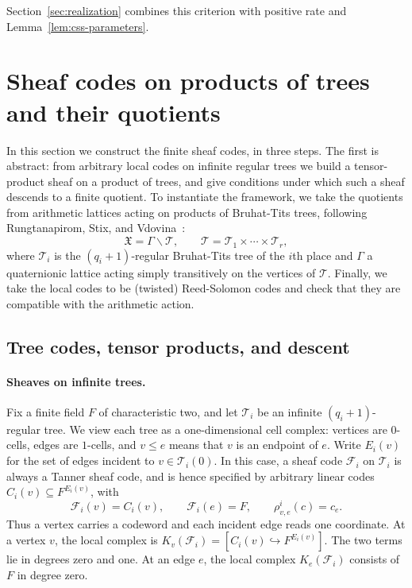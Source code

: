 \documentclass[11pt,letterpaper]{article}
\renewcommand{\le}{\leqslant}
\theoremstyle{definition}
\theoremstyle{remark}
\newcommand{\cF}{\mathcal F}
\newcommand{\X}{\mathfrak{X}}
\begin{document}
Section~\ref{sec:realization} combines this criterion with positive
rate and Lemma~\ref{lem:css-parameters}.

\section{Sheaf codes on products of trees and their quotients}
\label{sec:rs-construction}
\label{sec:coefficients}\label{sec:descent-certificate}

In this section we construct the finite sheaf codes, in three steps.
The first is abstract: from arbitrary local codes on infinite regular trees
we build a tensor-product sheaf on a product of trees, and give conditions
under which such a sheaf descends to a finite quotient. To
instantiate the framework, we take the quotients from arithmetic lattices acting on products of
Bruhat-Tits trees, following Rungtanapirom, Stix, and
Vdovina~\cite[Sections~2 and~6]{RSV2019}:
$$
    \X=\Gamma\backslash\mathcal T,
    \qquad
    \mathcal T=\mathcal T_1\times\cdots\times\mathcal T_r,
$$
where $\mathcal T_i$ is the $(q_i+1)$-regular Bruhat-Tits tree of the $i$th
place and $\Gamma$ a quaternionic lattice acting simply transitively on the
vertices of $\mathcal T$.
Finally, we take the local codes to be (twisted) Reed-Solomon codes and check that
they are compatible with the arithmetic action.

\subsection{Tree codes, tensor products, and descent}
\label{sec:tree-code-construction}
\paragraph{Sheaves on infinite trees.}
Fix a finite field $F$ of characteristic two, and let $\mathcal T_i$
be an infinite $(q_i+1)$-regular tree. We view each tree as a
one-dimensional cell complex: vertices are $0$-cells, edges are
$1$-cells, and $v\le e$ means that $v$ is an endpoint of $e$. 
Write $E_i(v)$ for the set of edges incident to
$v\in\mathcal T_i(0)$. In this case, a sheaf code $\cF_i$ on $\mathcal T_i$ is always a Tanner sheaf code, and is hence specified
by arbitrary linear codes $C_i(v)\subseteq F^{E_i(v)}$, with
\[
 \cF_i(v)=C_i(v),\qquad \cF_i(e)=F,\qquad
 \rho^i_{v,e}(c)=c_e.
\]
Thus a vertex carries a codeword and each incident edge reads one
coordinate.
At a vertex $v$, the local complex is
$
 K_v(\cF_i)=[C_i(v)\hookrightarrow F^{E_i(v)}].
$
The two terms lie in degrees zero and one. At an edge $e$, the local complex $K_e(\cF_i)$ consists of
$F$ in degree zero.
\end{document}
